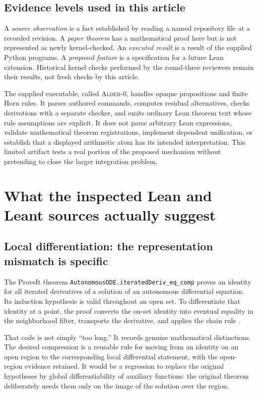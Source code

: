 \documentclass[11pt,a4paper]{article}
\newcommand{\code}[1]{\nolinkurl{#1}}
\newcommand{\Alder}{\textsc{Alder}}
\theoremstyle{plain}
\theoremstyle{definition}
\theoremstyle{remark}
\begin{document}
\subsection{Evidence levels used in this article}
A \emph{source observation} is a fact established by reading a named repository file at a recorded revision. A \emph{paper theorem} has a mathematical proof here but is not represented as newly kernel-checked. An \emph{executed result} is a result of the supplied Python programs. A \emph{proposed feature} is a specification for a future Lean extension. Historical kernel checks performed by the round-three reviewers remain their results, not fresh checks by this article.

The supplied executable, called \Alder{}-0, handles opaque propositions and finite Horn rules. It parses authored commands, computes residual alternatives, checks derivations with a separate checker, and emits ordinary Lean theorem text whose rule assumptions are explicit. It does not parse arbitrary Lean expressions, validate mathematical theorem registrations, implement dependent unification, or establish that a displayed arithmetic atom has its intended interpretation. This limited artifact tests a real portion of the proposed mechanism without pretending to close the larger integration problem.

\section{What the inspected Lean and Leant sources actually suggest}\label{sec:sources}

\subsection{Local differentiation: the representation mismatch is specific}
The ProveIt theorem \code{AutonomousODE.iteratedDeriv_eq_comp} proves an identity for all iterated derivatives of a solution of an autonomous differential equation. Its induction hypothesis is valid throughout an open set. To differentiate that identity at a point, the proof converts the on-set identity into eventual equality in the neighborhood filter, transports the derivative, and applies the chain rule \cite{autonomous}.

That code is not simply ``too long.'' It records genuine mathematical distinctions. The desired compression is a reusable rule for moving from an identity on an open region to the corresponding local differential statement, with the open-region evidence retained. It would be a regression to replace the original hypotheses by global differentiability of auxiliary functions: the original theorem deliberately needs them only on the image of the solution over the region.
\end{document}
